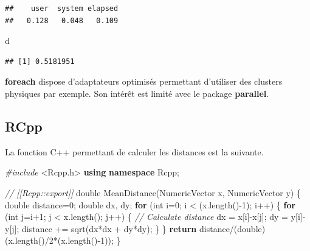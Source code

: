 \documentclass[
  12pt,
  french,
  a4paper,
  extrafontsizes,onecolumn,openright
  ]{memoir}
\newenvironment{Shaded}{\begin{snugshade}}{\end{snugshade}}
\newcommand{\CommentTok}[1]{\textcolor[rgb]{0.56,0.35,0.01}{\textit{#1}}}
\newcommand{\ControlFlowTok}[1]{\textcolor[rgb]{0.13,0.29,0.53}{\textbf{#1}}}
\newcommand{\DataTypeTok}[1]{\textcolor[rgb]{0.13,0.29,0.53}{#1}}
\newcommand{\DecValTok}[1]{\textcolor[rgb]{0.00,0.00,0.81}{#1}}
\newcommand{\ImportTok}[1]{#1}
\newcommand{\KeywordTok}[1]{\textcolor[rgb]{0.13,0.29,0.53}{\textbf{#1}}}
\newcommand{\NormalTok}[1]{#1}
\newcommand{\PreprocessorTok}[1]{\textcolor[rgb]{0.56,0.35,0.01}{\textit{#1}}}
\begin{document}
\begin{verbatim}
##    user  system elapsed 
##   0.128   0.048   0.109
\end{verbatim}

\begin{Shaded}
\begin{Highlighting}[]
\NormalTok{d}
\end{Highlighting}
\end{Shaded}

\begin{verbatim}
## [1] 0.5181951
\end{verbatim}

\normalsize

\textbf{foreach} dispose d'adaptateurs optimisés permettant d'utiliser des clusters physiques par exemple.
Son intérêt est limité avec le package \textbf{parallel}.

\hypertarget{rcpp}{%
\subsection{RCpp}\label{rcpp}}

La fonction C++ permettant de calculer les distances est la suivante.

\scriptsize

\begin{Shaded}
\begin{Highlighting}[]
\PreprocessorTok{#include }\ImportTok{<Rcpp.h>}
\KeywordTok{using} \KeywordTok{namespace}\NormalTok{ Rcpp;}

\CommentTok{// [[Rcpp::export]]}
\DataTypeTok{double}\NormalTok{ MeanDistance(NumericVector x, NumericVector y) \{}
  \DataTypeTok{double}\NormalTok{ distance=}\DecValTok{0}\NormalTok{;}
  \DataTypeTok{double}\NormalTok{ dx, dy;}
  \ControlFlowTok{for}\NormalTok{ (}\DataTypeTok{int}\NormalTok{ i=}\DecValTok{0}\NormalTok{; i < (x.length()-}\DecValTok{1}\NormalTok{); i++) \{}
    \ControlFlowTok{for}\NormalTok{ (}\DataTypeTok{int}\NormalTok{ j=i+}\DecValTok{1}\NormalTok{; j < x.length(); j++) \{}
    \CommentTok{// Calculate distance}
\NormalTok{        dx = x[i]-x[j];}
\NormalTok{        dy = y[i]-y[j];}
\NormalTok{        distance += sqrt(dx*dx + dy*dy);}
\NormalTok{    \}}
\NormalTok{  \}}
  \ControlFlowTok{return}\NormalTok{ distance/(}\DataTypeTok{double}\NormalTok{)(x.length()/}\DecValTok{2}\NormalTok{*(x.length()-}\DecValTok{1}\NormalTok{));}
\NormalTok{\}}
\end{Highlighting}
\end{Shaded}
\end{document}
